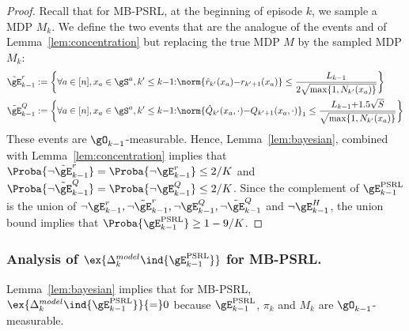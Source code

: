 \begin{subappendices}
\begin{proof}
    Recall that for MB-PSRL, at the beginning of episode $k$, we sample a MDP $M_{k}$. We define the two events that are the analogue of the events  and  of Lemma~\ref{lem:concentration} but replacing the true MDP $M$ by the sampled MDP $M_{k}$: 
    \begin{align*}
        &\tilde{\gE}_{k-1}^r:= \bigg\{\forall a\in[n], x_a\in\gS^a, k'\le k{-}1{:} \norm{\hat{r}_{k'}(x_a){-}r_{k'+1}(x_a)} \le \frac{L_{k-1}}{2\sqrt{\max\{1,N_{k'}(x_a)\} }}\bigg\} \\
        &\tilde{\gE}_{k-1}^Q:= \bigg\{\forall a\in[n], x_a\in\gS^a, k'\le k{-}1{:} \norm{\hat{Q}_{k'}(x_a,\cdot){-}Q_{k'+1}(x_a, \cdot)}_1 \le \frac{L_{k-1}{+}1.5\sqrt{S}}{\sqrt{\max\{1,N_{k'}(x_a)\} }}\bigg\} 
    \end{align*}
    These events are $\gO_{k-1}$-measurable. Hence, Lemma~\ref{lem:bayesian}, combined with Lemma~\ref{lem:concentration} implies that $\Proba{ \lnot \tilde{\gE}_{k-1}^r} =\Proba{ \lnot \gE_{k-1}^r}\le 2/K$ and $\Proba{\lnot \tilde{\gE}_{k-1}^Q}=\Proba{ \lnot \gE_{k-1}^Q}\le 2/K$. Since the complement of $\gE_{k-1}^\text{PSRL}$ is the union of $\lnot \gE_{k-1}^r, \lnot \tilde{\gE}_{k-1}^r, \lnot \gE_{k-1}^Q, \lnot \tilde{\gE}_{k-1}^Q$ and $\lnot \gE_{k-1}^H$, the union bound implies that $\Proba{\gE^\text{PSRL}_{k-1}}\ge1-9/K$.
\end{proof}

\subsubsection{Analysis of $\ex{\Delta^{model}_k \ind{\gE_{k-1}^\text{PSRL}}}$ for MB-PSRL.}

Lemma~\ref{lem:bayesian} implies that for MB-PSRL, $\ex{\Delta^{model}_k \ind{\gE_{k-1}^\text{PSRL}}}{=}0$ because
$\gE_{k-1}^\text{PSRL}$, $\pi_k$ and $M_k$ are $\gO_{k-1}$-measurable. 


\end{subappendices}

